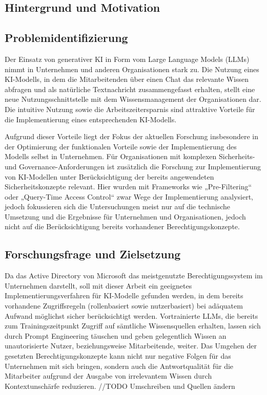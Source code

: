 
\subsection{Hintergrund und Motivation}

\subsection{Problemidentifizierung}
Der Einsatz von generativer KI in Form vom Large Language Models (LLMs) nimmt in Unternehmen und anderen Organisationen stark zu. Die Nutzung eines KI-Modells, in dem die Mitarbeitenden über einen Chat das relevante Wissen abfragen und als natürliche Textnachricht zusammengefasst erhalten, stellt eine neue Nutzungsschnittstelle mit dem Wissensmanagement der Organisationen dar. Die intuitive Nutzung sowie die Arbeitszeitersparnis sind attraktive Vorteile für die Implementierung eines entsprechenden KI-Modells.  

Aufgrund dieser Vorteile liegt der Fokus der aktuellen Forschung insbesondere in der Optimierung der funktionalen Vorteile sowie der Implementierung des Modells selbst in Unternehmen. Für Organisationen mit komplexen Sicherheits- und Governance-Anforderungen ist zusätzlich die Forschung zur Implementierung von KI-Modellen unter Berücksichtigung der bereits angewendeten Sicherheitskonzepte relevant. Hier wurden mit Frameworks wie „Pre-Filtering“ oder „Query-Time Access Control“ zwar Wege der Implementierung analysiert, jedoch fokussieren sich die Untersuchungen meist nur auf die technische Umsetzung und die Ergebnisse für Unternehmen und Organisationen, jedoch nicht auf die Berücksichtigung bereits vorhandener Berechtigungskonzepte. 

\subsection{Forschungsfrage und Zielsetzung}
Da das Active Directory von Microsoft das meistgenutzte Berechtigungssystem im Unternehmen darstellt, soll mit dieser Arbeit ein geeignetes Implementierungsverfahren für KI-Modelle gefunden werden, in dem bereits vorhandene Zugriffsregeln (rollenbasiert sowie nutzerbasiert) bei adäquatem Aufwand möglichst sicher berücksichtigt werden. Vortrainierte LLMs, die bereits zum Trainingszeitpunkt Zugriff auf sämtliche Wissensquellen erhalten, lassen sich durch Prompt Engineering täuschen und geben gelegentlich Wissen an unautorisierte Nutzer, beziehungsweise Mitarbeitende, weiter. Das Umgehen der gesetzten Berechtigungskonzepte kann nicht nur negative Folgen für das Unternehmen mit sich bringen, sondern auch die Antwortqualität für die Mitarbeiter aufgrund der Ausgabe von irrelevantem Wissen durch Kontextunschärfe reduzieren. //TODO Umschreiben und Quellen ändern

